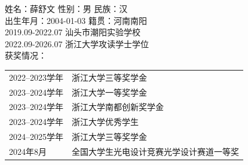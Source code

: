 \cleardoublepage
{}
姓名：薛舒文 性别：男 民族：汉 \\
出生年月：2004-01-03 籍贯：河南南阳 \\
2019.09-2022.07 汕头市潮阳实验学校 \\
2022.09-2026.07 浙江大学攻读学士学位 \\
获奖情况： \\
    \begin{tabular}{@{}p{4.2cm}p{10cm}@{}}
        2022--2023学年 & 浙江大学三等奖学金 \\
        2023--2024学年 & 浙江大学一等奖学金 \\
        2023--2024学年 & 浙江大学南都创新奖学金 \\
        2023--2024学年 & 浙江大学优秀学生 \\
        2024--2025学年 & 浙江大学三等奖学金 \\
        2024年8月 & 全国大学生光电设计竞赛光学设计赛道一等奖 \\
    \end{tabular}
